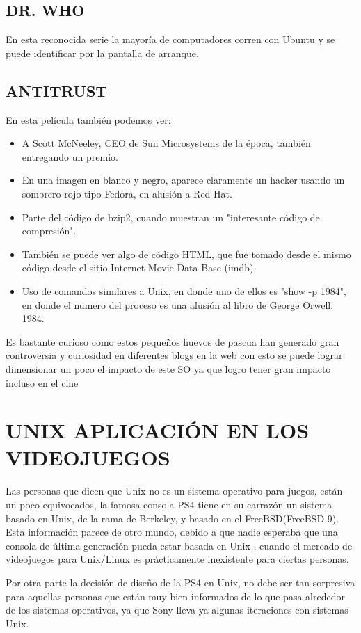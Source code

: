 \subsection*{DR. WHO}
En esta reconocida serie la mayoría de computadores corren con Ubuntu y se puede identificar por la pantalla de arranque.

\subsection*{ANTITRUST}
En esta película también podemos ver:
\begin{itemize}
	\item A Scott McNeeley, CEO de Sun Microsystems de la época, también entregando un premio.
	\item En una imagen en blanco y negro, aparece claramente un hacker usando un sombrero rojo tipo Fedora, en alusión a Red Hat.
	\item Parte del código de bzip2, cuando muestran un "interesante código de compresión".
	\item También se puede ver algo de código HTML, que fue tomado desde el mismo código desde el sitio Internet Movie Data Base (imdb).
	\item Uso de comandos similares a Unix, en donde uno de ellos es "show -p 1984", en donde el numero del proceso es una alusión al libro de George Orwell: 1984.
\end{itemize}

Es bastante curioso como estos pequeños huevos de pascua han generado gran controversia y curiosidad en diferentes blogs en la web con esto se puede lograr dimensionar un poco el impacto de este SO ya que logro tener gran impacto incluso en el cine 


\section*{UNIX  APLICACIÓN EN  LOS  VIDEOJUEGOS}
Las personas  que dicen que  Unix no es  un sistema operativo  para  juegos, están un poco  equivocados, la famosa consola PS4  tiene en su carrazón un sistema basado en  Unix, 
de la  rama de Berkeley, y basado en el  FreeBSD(FreeBSD 9). Esta información  parece de  otro  mundo, debido  a que  nadie  esperaba  que  una  consola  de  última generación  
pueda  estar  basada  en  Unix , cuando el  mercado de videojuegos  para  Unix/Linux  es  prácticamente inexistente para  ciertas  personas.
 
Por otra  parte  la decisión de diseño de la  PS4 en  Unix, no  debe  ser  tan sorpresiva  para  aquellas  personas  que  están  muy bien  informados  de lo que pasa  alrededor 
de los sistemas  operativos, ya  que  Sony lleva ya algunas  iteraciones con sistemas Unix.
 
